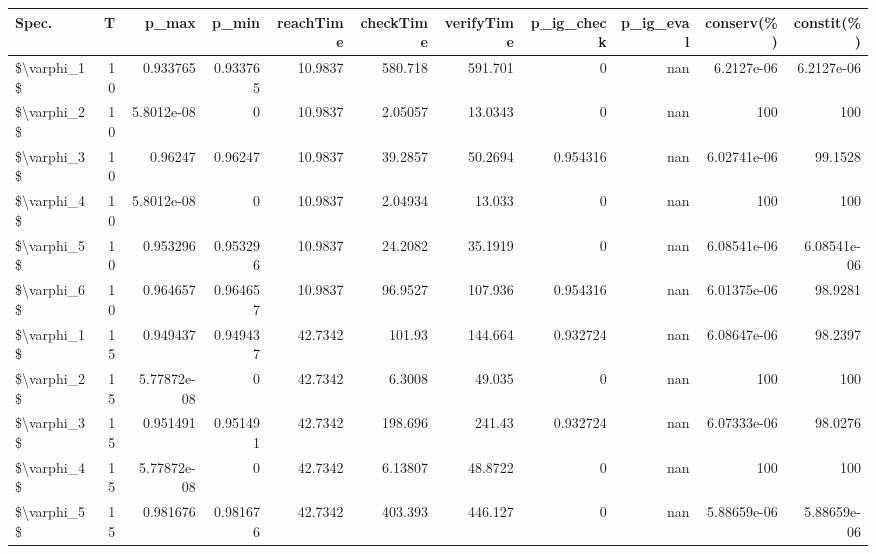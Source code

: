 \begin{tabular}{lrrrrrrrrrr}
\hline
 Spec.       &   T &       p\_max &    p\_min &   reachTime &      checkTime &   verifyTime &   p\_ig\_check &   p\_ig\_eval &    conserv(\%) &    constit(\%) \\
\hline
 \$\textbackslash{}varphi\_1\$ &  10 & 0.933765    & 0.933765 &     10.9837 &  580.718       &     591.701  &     0        &         nan &   6.2127e-06  &   6.2127e-06  \\
 \$\textbackslash{}varphi\_2\$ &  10 & 5.8012e-08  & 0        &     10.9837 &    2.05057     &      13.0343 &     0        &         nan & 100           & 100           \\
 \$\textbackslash{}varphi\_3\$ &  10 & 0.96247     & 0.96247  &     10.9837 &   39.2857      &      50.2694 &     0.954316 &         nan &   6.02741e-06 &  99.1528      \\
 \$\textbackslash{}varphi\_4\$ &  10 & 5.8012e-08  & 0        &     10.9837 &    2.04934     &      13.033  &     0        &         nan & 100           & 100           \\
 \$\textbackslash{}varphi\_5\$ &  10 & 0.953296    & 0.953296 &     10.9837 &   24.2082      &      35.1919 &     0        &         nan &   6.08541e-06 &   6.08541e-06 \\
 \$\textbackslash{}varphi\_6\$ &  10 & 0.964657    & 0.964657 &     10.9837 &   96.9527      &     107.936  &     0.954316 &         nan &   6.01375e-06 &  98.9281      \\
 \$\textbackslash{}varphi\_1\$ &  15 & 0.949437    & 0.949437 &     42.7342 &  101.93        &     144.664  &     0.932724 &         nan &   6.08647e-06 &  98.2397      \\
 \$\textbackslash{}varphi\_2\$ &  15 & 5.77872e-08 & 0        &     42.7342 &    6.3008      &      49.035  &     0        &         nan & 100           & 100           \\
 \$\textbackslash{}varphi\_3\$ &  15 & 0.951491    & 0.951491 &     42.7342 &  198.696       &     241.43   &     0.932724 &         nan &   6.07333e-06 &  98.0276      \\
 \$\textbackslash{}varphi\_4\$ &  15 & 5.77872e-08 & 0        &     42.7342 &    6.13807     &      48.8722 &     0        &         nan & 100           & 100           \\
 \$\textbackslash{}varphi\_5\$ &  15 & 0.981676    & 0.981676 &     42.7342 &  403.393       &     446.127  &     0        &         nan &   5.88659e-06 &   5.88659e-06 \\

\end{tabular}

